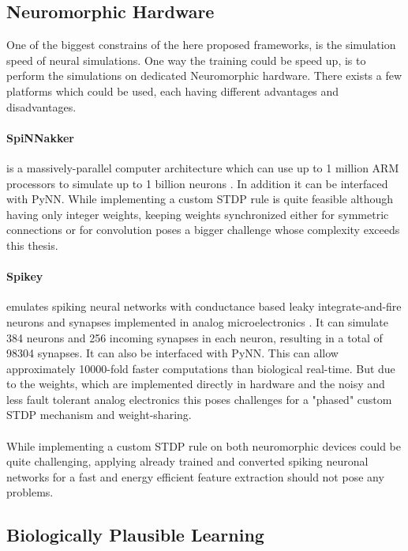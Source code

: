 \subsection{Neuromorphic Hardware} \label{c:neuhard}

One of the biggest constrains of the here proposed frameworks, is the simulation speed of neural simulations.
One way the training could be speed up, is to perform the simulations on dedicated Neuromorphic hardware. 
There exists a few platforms which could be used, each having different advantages and disadvantages.

\paragraph{SpiNNakker} \label{c:spinnakker}
is a massively-parallel computer architecture which can use up to 1 million ARM processors to simulate up to 1 billion neurons \cite{jin2008efficient}. 
In addition it can be interfaced with PyNN. 
While implementing a custom STDP rule is quite feasible although having only integer weights, keeping weights synchronized either for symmetric connections or for convolution poses a bigger challenge whose complexity exceeds this thesis.

\paragraph{Spikey} \label{c:spikey}
emulates spiking neural networks with conductance based leaky integrate-and-fire neurons and synapses implemented in analog microelectronics \cite{Pfeil1311}.
It can simulate 384 neurons and 256 incoming synapses in each neuron, resulting in a total of 98304 synapses.
It can also be interfaced with PyNN.
This can allow approximately 10000-fold faster computations than biological real-time.
But due to the weights, which are implemented directly in hardware and the noisy and less fault tolerant analog electronics this poses challenges for a "phased" custom STDP mechanism and weight-sharing. 
\\
\\
While implementing a custom STDP rule on both neuromorphic devices could be quite challenging, applying already trained and converted spiking neuronal networks for a fast and energy efficient feature extraction should not pose any problems.  

\subsection{Biologically Plausible Learning} \label{c:biofuture}

